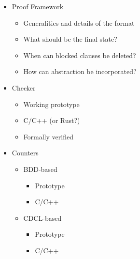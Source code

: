 \documentclass{llncs}
\begin{document}
\begin{itemize}
\item Proof Framework
  \begin{itemize}
  \item Generalities and details of the format
  \item What should be the final state?
  \item When can blocked clauses be deleted?
  \item How can abstraction be incorporated?
  \end{itemize}

\item Checker
  \begin{itemize}
  \item Working prototype
  \item C/C++ (or Rust?)
  \item Formally verified
  \end{itemize}

\item Counters
\begin{itemize}
\item BDD-based
  \begin{itemize}
  \item Prototype
  \item C/C++
  \end{itemize}

\item CDCL-based
  \begin{itemize}
  \item Prototype
  \item C/C++
  \end{itemize}
\end{itemize}

\end{itemize}



\end{document}

